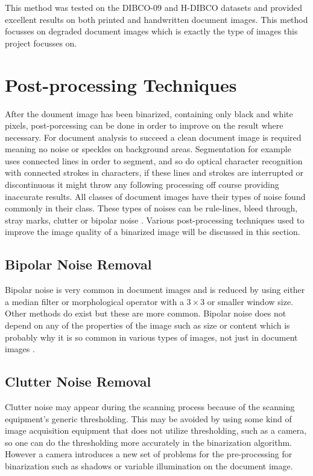 \documentclass[11pt]{article}
\begin{document}
      		This method was tested on the DIBCO-09 and H-DIBCO datasets and provided excellent results \cite{su2011combination} on both printed and handwritten document images. This method focusses on degraded document images which is exactly the type of images this project focusses on.

	\section{Post-processing Techniques}
		After the doument image has been binarized, containing only black and white pixels, post-porcessing can be done in order to improve on the result where necessary. For document analysis to succeed a clean document image is required meaning no noise or speckles on background areas. Segmentation for example uses connected lines in order to segment, and so do optical character recognition with connected strokes in characters, if these lines and strokes are interrupted or discontinuous it might throw any following processing off course providing inaccurate results. All classes of document images have their types of noise found commonly in their class. These types of noises can be rule-lines, bleed through, stray marks, clutter or bipolar noise \cite{agrawal2011stroke}. Various post-processing techniques used to improve the image quality of a binarized image will be discussed in this section.

		\subsection{Bipolar Noise Removal}
			Bipolar noise is very common in document images and is reduced by using either a median filter or morphological operator with a $3\times 3$ or smaller window size. Other methods do exist but these are more common. Bipolar noise does not depend on any of the properties of the image such as size or content which is probably why it is so common in various types of images, not just in document images \cite{agrawal2011stroke}.

		\subsection{Clutter Noise Removal}
			Clutter noise may appear during the scanning process because of the scanning equipment's generic thresholding. This may be avoided by using some kind of image acquisition equipment that does not utilize thresholding, such as a camera, so one can do the thresholding more accurately in the binarization algorithm. However a camera introduces a new set of problems for the pre-processing for binarization \cite{agrawal2011stroke} such as shadows or variable illumination on the document image.
\end{document}
